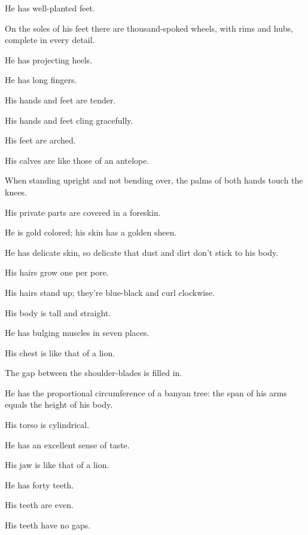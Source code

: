 \documentclass[12pt,openany]{book}%
\begin{document}
He has well-planted feet. 

On the soles of his feet there are thousand-spoked wheels, with rims and hubs, complete in every detail. 

He has projecting heels. 

He has long fingers. 

His hands and feet are tender. 

His hands and feet cling gracefully. 

His feet are arched. 

His calves are like those of an antelope. 

When standing upright and not bending over, the palms of both hands touch the knees. 

His private parts are covered in a foreskin. 

He is gold colored; his skin has a golden sheen. 

He has delicate skin, so delicate that dust and dirt don’t stick to his body. 

His hairs grow one per pore. 

His hairs stand up; they’re blue-black and curl clockwise. 

His body is tall and straight. 

He has bulging muscles in seven places. 

His chest is like that of a lion. 

The gap between the shoulder-blades is filled in. 

He has the proportional circumference of a banyan tree: the span of his arms equals the height of his body. 

His torso is cylindrical. 

He has an excellent sense of taste. 

His jaw is like that of a lion. 

He has forty teeth. 

His teeth are even. 

His teeth have no gaps. 
\end{document}
